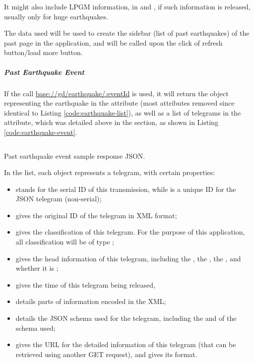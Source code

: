It might also include LPGM information, in  and , if such information is released, usually only for huge earthquakes.

The data used will be used to create the sidebar (list of past earthquakes) of the past page in the application, and will be called upon the click of refresh button/load more button.

\subparagraph{Past Earthquake Event} If the call \url{base://gd/earthquake/:eventId} is used, it will return the object representing the earthquake in the  attribute (most attributes removed since identical to Listing \ref{code:earthquake-list}), as well as a list of telegrams in the  attribute, which was detailed above in the  section, as shown in Listing \ref{code:earthquake-event}.

\begin{listing}[htp]
    \inputminted{json}{code/GdEarthquakeEvent.json}
    \caption{Past earthquake event sample response JSON.}
    \label{code:earthquake-event}
\end{listing}

In the  list, each object represents a telegram, with certain properties:
\begin{itemize}
    \item {} stands for the serial ID of this transmission, while  is a unique ID for the JSON telegram (non-serial);
    \item {} gives the original ID of the telegram in XML format;
    \item {} gives the classification of this telegram. For the purpose of this application, all classification will be of type ;
    \item {} gives the head information of this telegram, including the , the , the , and whether it is ;
    \item {} gives the time of this telegram being released,
    \item {} details parts of information encoded in the XML;
    \item {} details the JSON schema used for the telegram, including the  and  of the schema used;
    \item {} gives the URL for the detailed information of this telegram (that can be retrieved using another GET request), and  gives its format.
\end{itemize}

